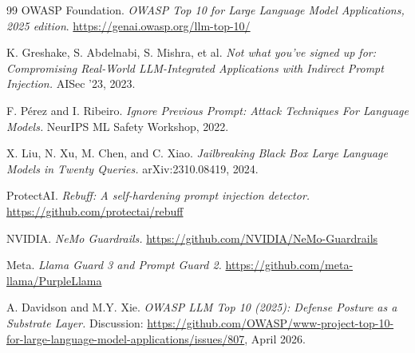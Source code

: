 \documentclass[10pt,letterpaper]{article}
\begin{document}
\begin{thebibliography}{99}
OWASP Foundation. \emph{OWASP Top 10 for Large Language Model
Applications, 2025 edition}.
\url{https://genai.owasp.org/llm-top-10/}

K. Greshake, S. Abdelnabi, S. Mishra, et al.
\emph{Not what you've signed up for: Compromising Real-World
LLM-Integrated Applications with Indirect Prompt Injection.}
AISec '23, 2023.

F. P\'erez and I. Ribeiro.
\emph{Ignore Previous Prompt: Attack Techniques For Language Models.}
NeurIPS ML Safety Workshop, 2022.

X. Liu, N. Xu, M. Chen, and C. Xiao.
\emph{Jailbreaking Black Box Large Language Models in Twenty Queries.}
arXiv:2310.08419, 2024.

ProtectAI. \emph{Rebuff: A self-hardening prompt injection detector.}
\url{https://github.com/protectai/rebuff}

NVIDIA. \emph{NeMo Guardrails.}
\url{https://github.com/NVIDIA/NeMo-Guardrails}

Meta. \emph{Llama Guard 3 and Prompt Guard 2.}
\url{https://github.com/meta-llama/PurpleLlama}

A. Davidson and M.Y. Xie.
\emph{OWASP LLM Top 10 (2025): Defense Posture as a Substrate Layer.}
Discussion: \url{https://github.com/OWASP/www-project-top-10-for-large-language-model-applications/issues/807}, April 2026.

\end{thebibliography}
\end{document}
